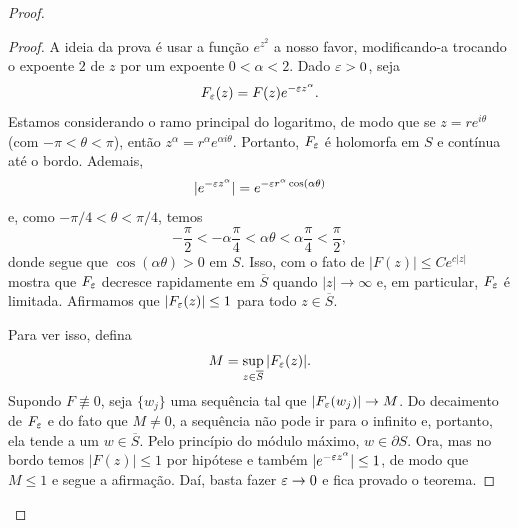 \begin{proof}
            \begin{proof}
                A ideia da prova é usar a função $e^{z^2}$ a nosso favor,
                modificando-a trocando o expoente $2$ de $z$ por um expoente
                $0<\alpha<2$. Dado $\varepsilon>0$, seja
                \begin{equation*}
                    F_{\varepsilon}(z) = F(z)e^{-\varepsilon z^{\alpha}}.
                \end{equation*}
                Estamos considerando o ramo principal do logaritmo, de modo
                que se $z = re^{i\theta}$ (com $-\pi < \theta < \pi$), então
                $z^{\alpha} = r^{\alpha}e^{\alpha i\theta}$. Portanto,
                $F_{\varepsilon}$ é holomorfa em $S$ e contínua até o bordo.
                Ademais,
                \begin{equation*}
                    |e^{-\varepsilon z^{\alpha}}| = e^{-\varepsilon r^{\alpha}\cos (\alpha\theta)}
                \end{equation*}
                e, como $-\pi /4 < \theta < \pi /4$, temos
                \begin{equation*}
                    -\frac{\pi}{2} < -\alpha\frac{\pi}{4} 
                    < \alpha\theta < \alpha\frac{\pi}{4} < \frac{\pi}{2},
                \end{equation*}
                donde segue que $\cos(\alpha\theta) > 0$ em $S$. Isso, com
                o fato de $|F(z)| \leq Ce^{c|z|}$ mostra que $F_{\varepsilon}$ decresce
                rapidamente em $\overline{S}$ quando $|z|\to\infty$ e, em
                particular, $F_{\varepsilon}$ é limitada. Afirmamos que 
                $|F_{\varepsilon}(z)| \leq 1$ para todo $z\in\overline{S}$.
                
                Para ver isso, defina
                \begin{equation*}
                    M = \sup_{z\in\overline{S}} |F_{\varepsilon}(z)|.
                \end{equation*}
                Supondo $F\not\equiv 0$, seja $\{w_j\}$ uma sequência tal 
                que $|F_{\varepsilon}(w_j)|\to M$. Do decaimento de $F_{\varepsilon}$ e 
                do fato que $M\neq 0$, a sequência não pode ir para o
                infinito e, portanto, ela tende a um $w\in\overline{S}$.
                Pelo princípio do módulo máximo, $w\in\partial S$. Ora, 
                mas no bordo temos $|F(z)| \leq 1$
                por hipótese e também $|e^{-\varepsilon z^{\alpha}}| \leq 1$, de
                modo que $M\leq 1$ e segue a afirmação. Daí, basta fazer
                $\varepsilon\to 0$ e fica provado o teorema.
            \end{proof}
            

\end{proof}
